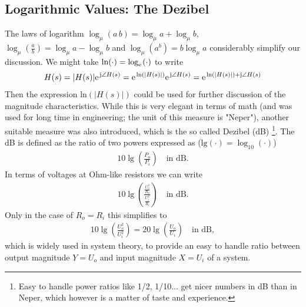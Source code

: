 \documentclass[a4paper,11pt,oneside]{scrartcl}
\begin{document}
\subsection{Logarithmic Values: The Dezibel}
The laws of logarithm $\log_\mu (a \, b) = \log_\mu a + \log_\mu b$,
$\log_\mu (\frac{a}{b}) = \log_\mu a - \log_\mu b$
and
$\log_\mu(a^b) = b \log_\mu a$
considerably simplify our discussion.
%
We might take $\text{ln}(\cdot) = \log_\e(\cdot)$ to write
\begin{align}
H(s) = |H(s)| \e^{\im \angle H(s)} = \e^{\text{ln}(|H(s)|)} \e^{\im \angle H(s)}=
\e^{\text{ln}(|H(s)|)+\im \angle H(s)}
\end{align}
Then the expression $\text{ln}(|H(s)|)$ could be used for further discussion
of the magnitude characteristics.
%
While this is very elegant in terms of math (and was used for long time in engineering; the unit of this
measure is "Neper"),
another suitable measure was also introduced, which is the so called Dezibel (dB)
\footnote{Easy to handle power ratios like 1/2, 1/10... get nicer numbers in dB
than in Neper, which however is a matter of taste and experience.}.
The dB is defined as the ratio of two powers expressed as ($\text{lg}(\cdot) = \log_{10}(\cdot)$)
\begin{align}
  10 \lg (\frac{P_o}{P_i}) \quad \text{in dB}.
\end{align}
%
In terms of voltages at Ohm-like resistors we can write
\begin{align}
  10 \lg (\frac{\frac{U_o^2}{R_o}}{\frac{U_i^2}{R_i}}) \quad \text{in dB}.
\end{align}
Only in the case of $R_o = R_i$ this simplifies to
\begin{align}
  10 \lg (\frac{U^2_o}{U^2_i}) = 20 \lg (\frac{U_o}{U_i}) \quad \text{in dB},
\end{align}
which is widely used in system theory, to provide an easy to handle ratio between
output magnitude $Y=U_o$ and input magnitude $X=U_i$ of a system.
\end{document}
